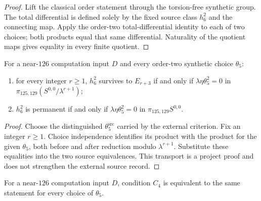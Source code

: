 \begin{proof}
  Lift the classical order statement through the torsion-free synthetic group.
  The total differential is defined solely by the fixed source class $h_6^2$
  and the connecting map.  Apply the order-two total-differential identity to
  each of two choices; both products equal that same differential.  Naturality
  of the quotient maps gives equality in every finite quotient.
\end{proof}

\begin{theorem}
  \label{thm:bjm-bx-criterion-any-choice}
  \notready
  For a near-$126$ computation input $D$ and every order-two synthetic choice
  $\theta_5$:
  \begin{enumerate}
    \item for every integer $r\ge1$, $h_6^2$ survives to $E_{r+3}$ if and
      only if $\lambda\eta\theta_5^2=0$ in
      $\pi_{125,129}(S^{0,0}/\lambda^{r+1})$;
    \item $h_6^2$ is permanent if and only if
      $\lambda\eta\theta_5^2=0$ in $\pi_{125,129}S^{0,0}$.
  \end{enumerate}
\end{theorem}

\begin{proof}
  Choose the distinguished $\theta_5^{\mathrm{src}}$ carried by the external
  criterion.  Fix an integer $r\ge1$.  Choice independence identifies its
  product with the product for the given $\theta_5$, both before and after reduction modulo
  $\lambda^{r+1}$.  Substitute these equalities into the two source
  equivalences.  This transport is a project proof and does not strengthen the
  external source record.
\end{proof}

\begin{lemma}
  \label{lem:near126-equiv-c4}
  \notready
  For a near-$126$ computation input $D$, condition $C_4$ is equivalent to the
  same statement for every choice of $\theta_5$.
\end{lemma}

